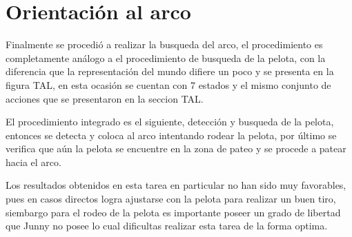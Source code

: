 \section{Orientaci\'on al arco}


Finalmente se procedi\'o a realizar la busqueda del arco, el procedimiento es completamente an\'alogo a el procedimiento de busqueda de la pelota, con la diferencia que la representaci\'on del mundo difiere un poco y se presenta en la figura TAL, en esta ocasi\'on se cuentan con 7 estados y el mismo conjunto de acciones que se presentaron en la seccion TAL.

El procedimiento integrado es el siguiente, detecci\'on y busqueda de la pelota, entonces se detecta y coloca al arco intentando rodear la pelota, por \'ultimo se verifica que a\'un la pelota se encuentre en la zona de pateo y se procede a patear hacia el arco.

Los resultados obtenidos en esta tarea en particular no han sido muy favorables, pues en casos directos logra ajustarse con la pelota para realizar un buen tiro, siembargo para el rodeo de la pelota es importante poseer un grado de libertad que Junny no posee lo cual dificultas realizar esta tarea de la forma optima.






